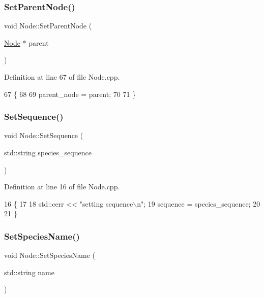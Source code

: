 \subsubsection{\texorpdfstring{Set\+Parent\+Node()}{SetParentNode()}}
{\footnotesize\ttfamily void Node\+::\+Set\+Parent\+Node (\begin{DoxyParamCaption}\item[{\hyperlink{classNode}{Node} $\ast$}]{parent }\end{DoxyParamCaption})}



Definition at line 67 of file Node.\+cpp.


\begin{DoxyCode}
67                                     \{
68   
69   parent\_node = parent;
70   
71 \}
\end{DoxyCode}
\mbox{\label{classNode_af92559fbef1938022d59b2902703afaa}} 
\subsubsection{\texorpdfstring{Set\+Sequence()}{SetSequence()}}
{\footnotesize\ttfamily void Node\+::\+Set\+Sequence (\begin{DoxyParamCaption}\item[{std\+::string}]{species\+\_\+sequence }\end{DoxyParamCaption})}



Definition at line 16 of file Node.\+cpp.


\begin{DoxyCode}
16                                                 \{
17   
18   std::cerr << \textcolor{stringliteral}{"setting sequence\(\backslash\)n"};
19   sequence = species\_sequence;
20   
21 \}
\end{DoxyCode}
\mbox{\label{classNode_af4ba012237c10c42f2118e629633b844}} 
\subsubsection{\texorpdfstring{Set\+Species\+Name()}{SetSpeciesName()}}
{\footnotesize\ttfamily void Node\+::\+Set\+Species\+Name (\begin{DoxyParamCaption}\item[{std\+::string}]{name }\end{DoxyParamCaption})}



